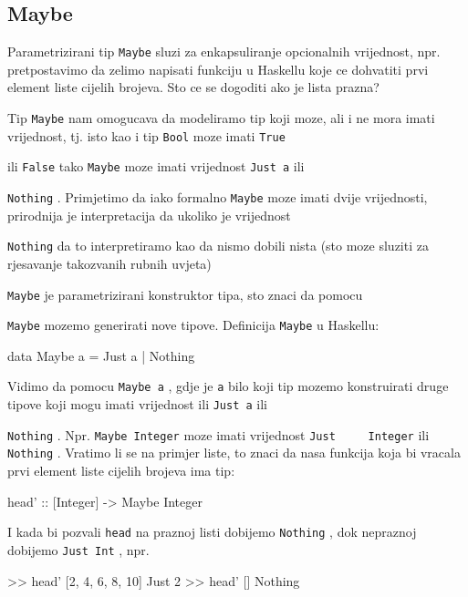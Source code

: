 \documentclass[11pt]{article}
\newcommand{\codei}[1]{
  {\lstinline[basicstyle=\ttfamily]{#1}}
}
\theoremstyle{definition}
\begin{document}
  \subsection{Maybe}
  Parametrizirani tip \codei{Maybe} sluzi za enkapsuliranje opcionalnih
  vrijednost, npr. pretpostavimo da zelimo napisati funkciju u Haskellu koje ce
  dohvatiti prvi element liste cijelih brojeva. Sto ce se dogoditi ako je lista prazna?

  Tip \codei{Maybe} nam omogucava da modeliramo tip koji moze, ali i ne mora
  imati vrijednost, tj. isto kao i tip \codei{Bool} moze imati \codei{True}
  ili \codei{False} tako \codei{Maybe} moze imati vrijednost \codei{Just a} ili
  \codei{Nothing}. Primjetimo da iako formalno \codei{Maybe} moze imati dvije
  vrijednosti, prirodnija je interpretacija da ukoliko je vrijednost
  \codei{Nothing} da to interpretiramo kao da nismo dobili nista (sto moze
  sluziti za rjesavanje takozvanih rubnih uvjeta)

  \codei{Maybe} je parametrizirani konstruktor tipa, sto znaci da pomocu
  \codei{Maybe} mozemo generirati nove tipove. Definicija \codei{Maybe} u
  Haskellu:
  \begin{mcode}
    data Maybe a = Just a | Nothing
  \end{mcode}
  Vidimo da pomocu \codei{Maybe a}, gdje je \codei{a} bilo koji tip mozemo
  konstruirati druge tipove koji mogu imati vrijednost ili \codei{Just a} ili
  \codei{Nothing}. Npr. \codei{Maybe Integer} moze imati vrijednost \codei{Just
    Integer} ili \codei{Nothing}. Vratimo li se na primjer liste, to znaci da nasa funkcija
  koja bi vracala prvi element liste cijelih brojeva ima tip:
  \begin{mcode}
    head' :: [Integer] -> Maybe Integer
  \end{mcode}
  I kada bi pozvali \codei{head} na praznoj listi dobijemo \codei{Nothing}, dok
  nepraznoj dobijemo \codei{Just Int}, npr.
  \begin{mcode}
    >> head' [2, 4, 6, 8, 10]
    Just 2
    >> head' []
    Nothing
  \end{mcode}
\end{document}
